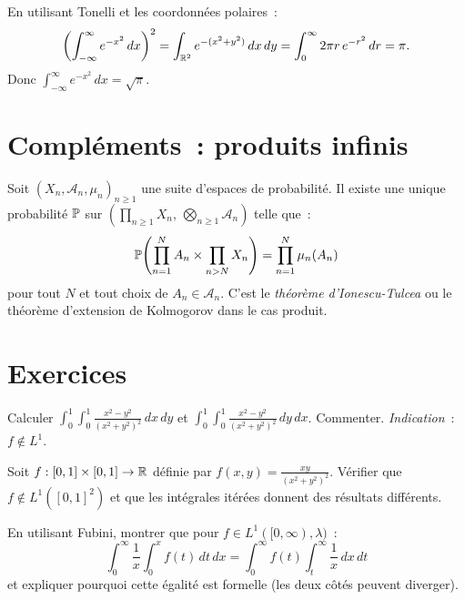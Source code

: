 \begin{exemple}
En utilisant Tonelli et les coordonn\'ees polaires~:
\[
    \left(\int_{-\infty}^{\infty} e^{-x^2}\, dx\right)^2
    = \int_{\mathbb{R}^2} e^{-(x^2+y^2)}\, dx\, dy
    = \int_0^{\infty} 2\pi r\, e^{-r^2}\, dr = \pi.
\]
Donc $\int_{-\infty}^{\infty} e^{-x^2}\, dx = \sqrt{\pi}$.
\end{exemple}

\section{Compl\'ements~: produits infinis}

\begin{theoreme}
Soit $(X_n, \mathcal{A}_n, \mu_n)_{n \geq 1}$ une suite d'espaces de probabilit\'e.
Il existe une unique probabilit\'e $\mathbb{P}$ sur
$\left(\prod_{n \geq 1} X_n,\, \bigotimes_{n \geq 1} \mathcal{A}_n\right)$ telle que~:
\[
    \mathbb{P}\!\left(\prod_{n=1}^{N} A_n \times \prod_{n > N} X_n\right)
    = \prod_{n=1}^{N} \mu_n(A_n)
\]
pour tout $N$ et tout choix de $A_n \in \mathcal{A}_n$. C'est le
\emph{th\'eor\`eme d'Ionescu-Tulcea} ou le th\'eor\`eme d'extension de Kolmogorov
dans le cas produit.
\end{theoreme}

\section{Exercices}

\begin{exercice}
Calculer $\int_0^1 \int_0^1 \frac{x^2 - y^2}{(x^2 + y^2)^2}\, dx\, dy$ et
$\int_0^1 \int_0^1 \frac{x^2 - y^2}{(x^2 + y^2)^2}\, dy\, dx$. Commenter.
\emph{Indication}~: $f \notin L^1$.
\end{exercice}

\begin{exercice}
Soit $f : [0,1] \times [0,1] \to \mathbb{R}$ d\'efinie par $f(x,y) = \frac{xy}{(x^2+y^2)^2}$.
V\'erifier que $f \notin L^1([0,1]^2)$ et que les int\'egrales it\'er\'ees donnent
des r\'esultats diff\'erents.
\end{exercice}

\begin{exercice}
En utilisant Fubini, montrer que pour $f \in L^1([0,\infty), \lambda)$~:
\[
    \int_0^{\infty} \frac{1}{x} \int_0^x f(t)\, dt\, dx
    = \int_0^{\infty} f(t) \int_t^{\infty} \frac{1}{x}\, dx\, dt
\]
et expliquer pourquoi cette \'egalit\'e est formelle (les deux c\^ot\'es peuvent diverger).
\end{exercice}

